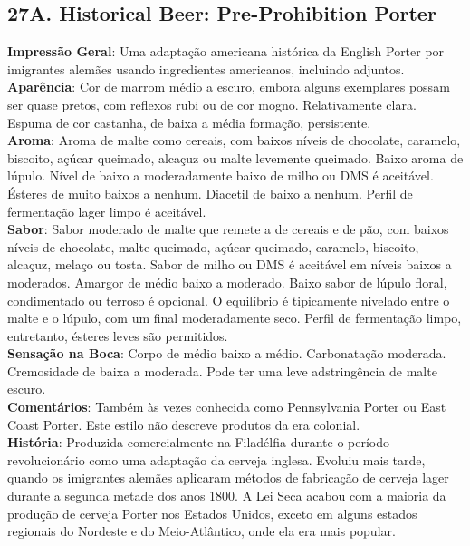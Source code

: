 \subsection*{27A. Historical Beer: Pre-Prohibition Porter}
\textbf{Impressão Geral}: Uma adaptação americana histórica da English Porter por imigrantes alemães usando ingredientes americanos, incluindo adjuntos. \\
\textbf{Aparência}: Cor de marrom médio a escuro, embora alguns exemplares possam ser quase pretos, com reflexos rubi ou de cor mogno. Relativamente clara. Espuma de cor castanha, de baixa a média formação, persistente. \\
\textbf{Aroma}: Aroma de malte como cereais, com baixos níveis de chocolate, caramelo, biscoito, açúcar queimado, alcaçuz ou malte levemente queimado. Baixo aroma de lúpulo. Nível de baixo a moderadamente baixo de milho ou DMS é aceitável. Ésteres de muito baixos a nenhum. Diacetil de baixo a nenhum. Perfil de fermentação lager limpo é aceitável. \\
\textbf{Sabor}: Sabor moderado de malte que remete a de cereais e de pão, com baixos níveis de chocolate, malte queimado, açúcar queimado, caramelo, biscoito, alcaçuz, melaço ou tosta. Sabor de milho ou DMS é aceitável em níveis baixos a moderados. Amargor de médio baixo a moderado. Baixo sabor de lúpulo floral, condimentado ou terroso é opcional. O equilíbrio é tipicamente nivelado entre o malte e o lúpulo, com um final moderadamente seco. Perfil de fermentação limpo, entretanto, ésteres leves são permitidos. \\
\textbf{Sensação na Boca}: Corpo de médio baixo a médio. Carbonatação moderada. Cremosidade de baixa a moderada. Pode ter uma leve adstringência de malte escuro. \\
\textbf{Comentários}: Também às vezes conhecida como Pennsylvania Porter ou East Coast Porter. Este estilo não descreve produtos da era colonial. \\
\textbf{História}: Produzida comercialmente na Filadélfia durante o período revolucionário como uma adaptação da cerveja inglesa. Evoluiu mais tarde, quando os imigrantes alemães aplicaram métodos de fabricação de cerveja lager durante a segunda metade dos anos 1800. A Lei Seca acabou com a maioria da produção de cerveja Porter nos Estados Unidos, exceto em alguns estados regionais do Nordeste e do Meio-Atlântico, onde ela era mais popular. \\
